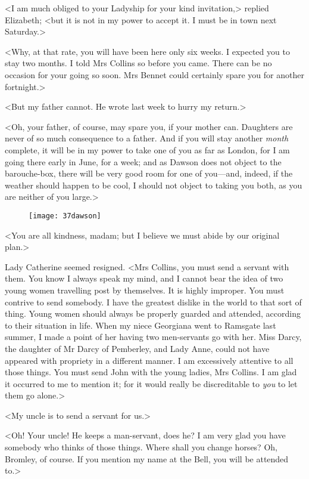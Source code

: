 <I am much obliged to your Ladyship for your kind invitation,> replied Elizabeth; <but it is not in my power to accept it. I must be in town next Saturday.>

<Why, at that rate, you will have been here only six weeks. I expected you to stay two months. I told Mrs Collins so before you came. There can be no occasion for your going so soon. Mrs Bennet could certainly spare you for another fortnight.>

<But my father cannot. He wrote last week to hurry my return.>

<Oh, your father, of course, may spare you, if your mother can. Daughters are never of so much consequence to a father. And if you will stay another \textit{month} complete, it will be in my power to take one of you as far as London, for I am going there early in June, for a week; and as Dawson does not object to the barouche-box, there will be very good room for one of you—and, indeed, if the weather should happen to be cool, I should not object to taking you both, as you are neither of you large.>

\begin{figure}[tbh]
\centering
\texttt{[image: 37dawson]}
\end{figure}

<You are all kindness, madam; but I believe we must abide by our original plan.>

Lady Catherine seemed resigned. <Mrs Collins, you must send a servant with them. You know I always speak my mind, and I cannot bear the idea of two young women travelling post by themselves. It is highly improper. You must contrive to send somebody. I have the greatest dislike in the world to that sort of thing. Young women should always be properly guarded and attended, according to their situation in life. When my niece Georgiana went to Ramsgate last summer, I made a point of her having two men-servants go with her. Miss Darcy, the daughter of Mr Darcy of Pemberley, and Lady Anne, could not have appeared with propriety in a different manner. I am excessively attentive to all those things. You must send John with the young ladies, Mrs Collins. I am glad it occurred to me to mention it; for it would really be discreditable to \textit{you} to let them go alone.>

<My uncle is to send a servant for us.>

<Oh! Your uncle! He keeps a man-servant, does he? I am very glad you have somebody who thinks of those things. Where shall you change horses? Oh, Bromley, of course. If you mention my name at the Bell, you will be attended to.>

